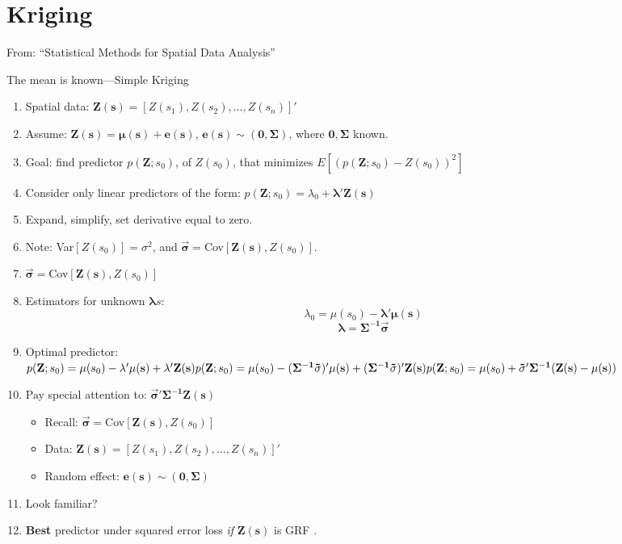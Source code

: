 \documentclass{article}
\begin{document}
\section{Kriging}

From: ``Statistical Methods for Spatial Data Analysis'' \citep{Schabenberger2004}

The mean is known---Simple Kriging
\begin{enumerate}
\item Spatial data: $\mathbf{Z(s)} = [Z(s_{1}), Z(s_{2}),\hdots, Z(s_{n})]'$

\item Assume: $\mathbf{Z(s) = \mu(s) + e(s)}$, $\mathbf{e(s) \sim (0, \Sigma)}$, where $\mathbf{0, \Sigma}$ known.

\item Goal: find predictor $p(\mathbf{Z};s_{0})$, of $Z(s_{0})$, that minimizes $E\left[ \left(p(\mathbf{Z};s_{0}) - Z(s_{0}) \right)^{2}\right]$ 

\item Consider only linear predictors of the form: $p(\mathbf{Z};s_{0}) = \lambda_{0} + \mathbf{\lambda 'Z(s)}$

\item Expand, simplify, set derivative equal to zero.

\item Note: Var$[Z(s_{0})] = \sigma^{2}$, and $\mathbf{\vec{\sigma} =}$Cov$[\mathbf{Z(s)},Z(s_{0})]$.

\item $\mathbf{\vec{\sigma} =}$Cov$[\mathbf{Z(s)},Z(s_{0})]$

\item Estimators for unknown $\mathbf{\lambda}s$:
$$ \lambda_{0} = \mu(s_{0}) - \mathbf{\lambda'\mu(s)} $$
$$ \mathbf{\lambda = \Sigma^{-1}\vec{\sigma}} $$

\item Optimal predictor: \\ 
$p(\mathbf{Z};s_{0}) = \mu(s_{0}) - \mathbf{\lambda'\mu(s)} + \mathbf{\lambda}'\mathbf{Z(s)} \\
p(\mathbf{Z};s_{0}) = \mu(s_{0}) - (\mathbf{\Sigma^{-1}\vec{\sigma}})'\mathbf{\mu(s)} + (\mathbf{\Sigma^{-1}\vec{\sigma}})'\mathbf{Z(s)} \\
p(\mathbf{Z};s_{0}) = \mu(s_{0}) + \mathbf{ \vec{\sigma}'\Sigma^{-1}(Z(s) - \mu(s)) }$

\item Pay special attention to: $\mathbf{ \vec{\sigma}'\Sigma^{-1}Z(s)}$
  \begin{itemize}
  \item Recall: $\mathbf{\vec{\sigma} =}$Cov$[\mathbf{Z(s)},Z(s_{0})]$
  \item Data: $\mathbf{Z(s)} = [Z(s_{1}), Z(s_{2}),\hdots, Z(s_{n})]'$
  \item Random effect: $\mathbf{e(s) \sim (0, \Sigma)}$
  \end{itemize}

\item Look familiar?

\item {\bf Best} predictor under squared error loss {\it if } $\mathbf{Z(s)}$ is GRF .
\end{enumerate}


\end{document}
